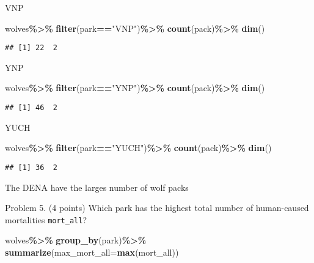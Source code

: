 \documentclass[
]{article}
\newenvironment{Shaded}{\begin{snugshade}}{\end{snugshade}}
\newcommand{\AttributeTok}[1]{\textcolor[rgb]{0.13,0.29,0.53}{#1}}
\newcommand{\FunctionTok}[1]{\textcolor[rgb]{0.13,0.29,0.53}{\textbf{#1}}}
\newcommand{\NormalTok}[1]{#1}
\newcommand{\SpecialCharTok}[1]{\textcolor[rgb]{0.81,0.36,0.00}{\textbf{#1}}}
\newcommand{\StringTok}[1]{\textcolor[rgb]{0.31,0.60,0.02}{#1}}
\begin{document}
VNP

\begin{Shaded}
\begin{Highlighting}[]
\NormalTok{wolves}\SpecialCharTok{\%\textgreater{}\%}
  \FunctionTok{filter}\NormalTok{(park}\SpecialCharTok{==}\StringTok{"VNP"}\NormalTok{)}\SpecialCharTok{\%\textgreater{}\%}
  \FunctionTok{count}\NormalTok{(pack)}\SpecialCharTok{\%\textgreater{}\%}
  \FunctionTok{dim}\NormalTok{()}
\end{Highlighting}
\end{Shaded}

\begin{verbatim}
## [1] 22  2
\end{verbatim}

YNP

\begin{Shaded}
\begin{Highlighting}[]
\NormalTok{wolves}\SpecialCharTok{\%\textgreater{}\%}
  \FunctionTok{filter}\NormalTok{(park}\SpecialCharTok{==}\StringTok{"YNP"}\NormalTok{)}\SpecialCharTok{\%\textgreater{}\%}
  \FunctionTok{count}\NormalTok{(pack)}\SpecialCharTok{\%\textgreater{}\%}
  \FunctionTok{dim}\NormalTok{()}
\end{Highlighting}
\end{Shaded}

\begin{verbatim}
## [1] 46  2
\end{verbatim}

YUCH

\begin{Shaded}
\begin{Highlighting}[]
\NormalTok{wolves}\SpecialCharTok{\%\textgreater{}\%}
  \FunctionTok{filter}\NormalTok{(park}\SpecialCharTok{==}\StringTok{"YUCH"}\NormalTok{)}\SpecialCharTok{\%\textgreater{}\%}
  \FunctionTok{count}\NormalTok{(pack)}\SpecialCharTok{\%\textgreater{}\%}
  \FunctionTok{dim}\NormalTok{()}
\end{Highlighting}
\end{Shaded}

\begin{verbatim}
## [1] 36  2
\end{verbatim}

The DENA have the larges number of wolf packs

Problem 5. (4 points) Which park has the highest total number of
human-caused mortalities \texttt{mort\_all}?

\begin{Shaded}
\begin{Highlighting}[]
\NormalTok{wolves}\SpecialCharTok{\%\textgreater{}\%}
  \FunctionTok{group\_by}\NormalTok{(park)}\SpecialCharTok{\%\textgreater{}\%}
  \FunctionTok{summarize}\NormalTok{(}\AttributeTok{max\_mort\_all=}\FunctionTok{max}\NormalTok{(mort\_all))}
\end{Highlighting}
\end{Shaded}
\end{document}
